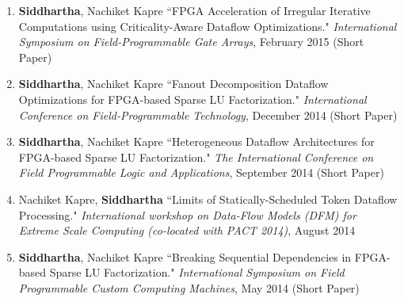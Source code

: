 \documentclass[10pt]{article}
\begin{document}
\begin{enumerate}
    \item {\bf Siddhartha}, Nachiket Kapre ``FPGA Acceleration of Irregular Iterative Computations using Criticality-Aware Dataflow Optimizations." \emph{International Symposium on Field-Programmable Gate Arrays}, February 2015 (Short Paper)
    \item {\bf Siddhartha}, Nachiket Kapre ``Fanout Decomposition Dataflow Optimizations for FPGA-based Sparse LU Factorization." \emph{International Conference on Field-Programmable Technology}, December 2014 (Short Paper)
    \item {\bf Siddhartha}, Nachiket Kapre ``Heterogeneous Dataflow Architectures for FPGA-based Sparse LU Factorization." \emph{The International Conference on Field Programmable Logic and Applications}, September 2014 (Short Paper)
    \item Nachiket Kapre, {\bf Siddhartha} ``Limits of Statically-Scheduled Token Dataflow Processing." \emph{International workshop on Data-Flow Models (DFM) for Extreme Scale Computing (co-located with PACT 2014)}, August 2014
    \item {\bf Siddhartha}, Nachiket Kapre ``Breaking Sequential Dependencies in FPGA-based Sparse LU Factorization." \emph{International Symposium on Field Programmable Custom Computing Machines}, May 2014 (Short Paper)
\end{enumerate}
\end{document}
